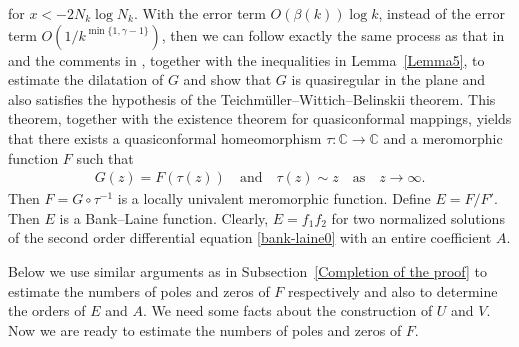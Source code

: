 \documentclass[12pt]{amsart}
\numberwithin{equation}{section}
\begin{document}
for $x<-2N_k\log N_k$. With the error term $O(\beta(k))\log k$, instead of the error term $O(1/k^{\min\{1,\gamma-1\}})$, then we can follow exactly the same process as that in~\cite[Subsection~3.3]{Bergweilereremenko2019} and the comments in \cite[Subsection~2.3]{Zhang2024}, together with the inequalities in Lemma~\ref{Lemma5}, to estimate the dilatation of $G$ and show that $G$ is quasiregular in the plane and also satisfies the hypothesis of the Teichm\"uller--Wittich--Belinskii theorem.  This theorem, together with the existence theorem for quasiconformal mappings, yields that there exists a quasiconformal homeomorphism $\tau:\mathbb{C}\to\mathbb{C}$ and a meromorphic function $F$ such that
\begin{equation}\label{recuree1pm117}
\begin{split}
G(z)=F(\tau(z)) \quad \text{and} \quad \tau(z)\sim z \quad \text{as} \quad z\to\infty.
\end{split}
\end{equation}
Then $F=G\circ \tau^{-1}$ is a locally univalent meromorphic function. Define $E=F/F'$. Then $E$ is a Bank--Laine function. Clearly, $E=f_1f_2$ for two normalized solutions of the second order differential equation \eqref{bank-laine0} with an entire coefficient $A$.

Below we use similar arguments as in Subsection~\ref{Completion of the proof} to estimate the numbers of poles and zeros of $F$ respectively and also to determine the orders of $E$ and $A$. We need some facts about the construction of $U$ and $V$. Now we are ready to estimate the numbers of poles and zeros of $F$.
\end{document}
